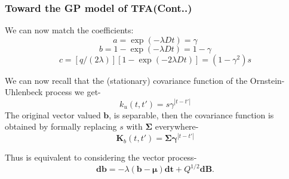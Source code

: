 \documentclass{beamer}
\begin{document}
\begin{frame}
\frametitle{Toward the GP model of TFA(Cont..)}
We can now match the coefficients:
\begin{equation} \label{eq:a}
a = \exp(-\lambda Dt) = \gamma
\end{equation}
\begin{equation} \label{eq:b}
b = 1 - \exp(-\lambda Dt) = 1 - \gamma
\end{equation}
\begin{equation} \label{eq:c}
c = [q / (2 \lambda)] [1 - \exp(-2 \lambda Dt)]= (1 - \gamma^2) s 
\end{equation}

We can now recall that the (stationary) covariance function of the Ornstein-Uhlenbeck process we get-
\begin{equation}
k_u(t,t')= s \gamma^{\left|t-t'\right|}
\end{equation}
The original vector valued $\textbf{b}$, is separable, then the covariance function is obtained by formally replacing $s$ with 
$\boldsymbol{\Sigma}$ everywhere- 
\begin{equation}
\textbf{K}_b(t,t') = \boldsymbol{\Sigma} \boldsymbol{\gamma}^{\left|t-t'\right|}
\end{equation}

Thus is equivalent to considering the vector process- 
\begin{equation}
\textbf{db} = -\lambda (\textbf{b} - \boldsymbol{\mu}) \textbf{dt} + Q^{1/2} \textbf{dB}.
\end{equation}

\end{frame}

\end{document}
